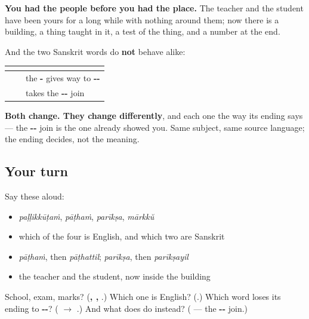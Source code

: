 \begin{grammarlens}[title={What you've built}]
\textbf{You had the people before you had the place.} The teacher and the student have been yours for a long while with nothing around them; now there is a building, a thing taught in it, a test of the thing, and a number at the end.

And the two Sanskrit words do \textbf{not} behave alike:

\noindent
\begin{tabularx}{\linewidth}{@{}>{\raggedright\arraybackslash}X>{\raggedright\arraybackslash}X>{\raggedright\arraybackslash}X@{}}
\toprule
\textbf{} & \textbf{} & \textbf{} \\
\midrule
\textbf{\ml{പാഠം}} & \textbf{\ml{പാഠത്തിൽ}} & the \textbf{-\ml{ം}} gives way to \textbf{-\ml{ത്ത}-} \\
\textbf{\ml{പരീക്ഷ}} & \textbf{\ml{പരീക്ഷയിൽ}} & \textbf{\ml{അ}} takes the \textbf{-\ml{യ}-} join \\
\bottomrule
\end{tabularx}

\textbf{Both change. They change differently}, and each one the way its ending says — the \textbf{--} join is the one \textbf{} already showed you. Same subject, same source language; the ending decides, not the meaning.
\end{grammarlens}

\subsection*{Your turn}
Say these aloud:

\begin{itemize}
\raggedright
  \item \emph{paḷḷikkūṭaṁ}, \emph{pāṭhaṁ}, \emph{parīkṣa}, \emph{mārkkŭ}
  \item which of the four is English, and which two are Sanskrit
  \item \emph{pāṭhaṁ}, then \emph{pāṭhattil}; \emph{parīkṣa}, then \emph{parīkṣayil}
  \item the teacher and the student, now inside the building
\end{itemize}

\begin{tcolorbox}[breakable,colback=teal!4,colframe=teal!35!black,title={Before you move on}]
School, exam, marks? (\textbf{, , }.) Which one is English? (\textbf{}.) Which word loses its ending to \textbf{--}? (\textbf{} $\to$ \textbf{}.) And what does \textbf{} do instead? (\textbf{} — the \textbf{--} join.)
\end{tcolorbox}
